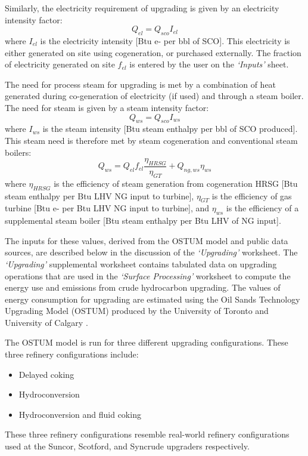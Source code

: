 \documentclass[11pt]{report}
\newcommand{\sheet}[1]{\textit{`{#1}'}}
\begin{document}
Similarly, the electricity requirement of upgrading is given by an electricity intensity factor:
\begin{equation}
Q_{el} = Q_{sco}I_{el}
\end{equation}
where $I_{el}$ is the electricity intensity [Btu e- per bbl of SCO].  This electricity is either generated on site using cogeneration, or purchased externally. The fraction of electricity generated on site $f_{el}$ is entered by the user on the \sheet{Inputs} sheet.  

The need for process steam for upgrading is met by a combination of heat generated during co-generation of electricity (if used) and through a steam boiler.  The need for steam is given by a steam intensity factor:
\begin{equation}
Q_{ws} = Q_{sco}I_{ws}
\end{equation}
where $I_{ws}$ is the steam intensity [Btu steam enthalpy per bbl of SCO produced].  This steam need is therefore met by steam cogeneration and conventional steam boilers:
\begin{equation}
Q_{ws} = Q_{el}f_{el}\frac{\eta_{HRSG}}{\eta_{GT}} + Q_{ng,ws}\eta_{ws}
\end{equation}
where $\eta_{HRSG}$ is the efficiency of steam generation from cogeneration HRSG [Btu steam enthalpy per Btu LHV NG input to turbine], $\eta_{GT}$ is the efficiency of gas turbine [Btu e- per Btu LHV NG input to turbine], and $\eta_{ws}$ is the efficiency of a supplemental steam boiler [Btu steam enthalpy per Btu LHV of NG input].

The inputs for these values, derived from the OSTUM model and public data sources, are described below in the discussion of the \sheet{Upgrading} worksheet.
The \sheet{Upgrading} supplemental worksheet contains tabulated data on upgrading operations that are used in the \sheet{Surface Processing} worksheet to compute the energy use and emissions from crude hydrocarbon upgrading.  The values of energy consumption for upgrading are estimated using the Oil Sands Technology Upgrading Model (OSTUM) produced by the University of Toronto and University of Calgary \cite{OSTUM2016}.

The OSTUM model is run for three different upgrading configurations.  These three refinery configurations include:
\begin{itemize}
\item Delayed coking
\item Hydroconversion
\item Hydroconversion and fluid coking
\end{itemize}
These three refinery configurations resemble real-world refinery configurations used at the Suncor, Scotford, and Syncrude upgraders respectively.
\end{document}

